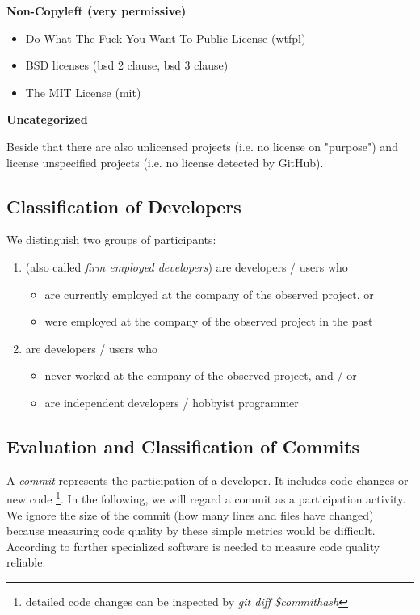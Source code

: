 \textbf{Non-Copyleft (very permissive)}

\begin{itemize}
	\item Do What The Fuck You Want To Public License (wtfpl)
	\item BSD licenses (bsd 2 clause, bsd 3 clause)
	\item The MIT License (mit)
\end{itemize}

\textbf{Uncategorized}

Beside that there are also unlicensed projects (i.e. no license on "purpose") and license unspecified projects (i.e. no license detected by GitHub).

\subsection{Classification of Developers}

We distinguish two groups of participants:

\begin{enumerate}
	\item [\textbf{1) Internal Developers}] (also called \textit{firm employed developers}) are developers / users who
	\begin{itemize}
		\item are currently employed at the company of the observed project, or
		\item were employed at the company of the observed project in the past
	\end{itemize}
	\item [\textbf{2) External Developers}] are developers / users who
	\begin{itemize}
		\item never worked at the company of the observed project, and / or
		\item are independent developers / hobbyist programmer
	\end{itemize}
\end{enumerate}

\subsection{Evaluation and Classification of Commits}

A \textit{commit} represents the participation of a developer. It includes code changes or new code \footnote{detailed code changes can be inspected by \textit{git diff \$commithash}}. In the following, we will regard a commit as a participation activity. We ignore the size of the commit (how many lines and files have changed) because measuring code quality by these simple metrics would be difficult. According to \cite{stamelos2002code} further specialized software is needed to measure code quality reliable.

